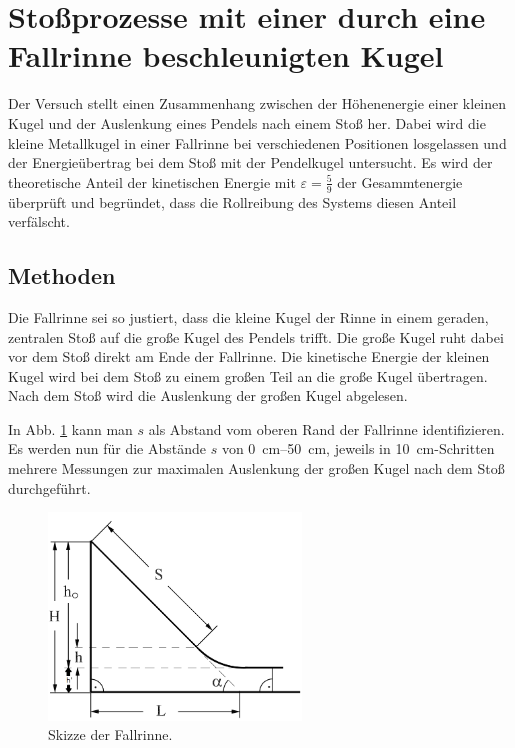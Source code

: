 \section{Stoßprozesse mit einer durch eine Fallrinne beschleunigten Kugel}
Der Versuch stellt einen Zusammenhang zwischen der Höhenenergie einer kleinen Kugel und der Auslenkung eines Pendels nach einem Stoß her.
Dabei wird die kleine Metallkugel in einer Fallrinne bei verschiedenen Positionen losgelassen und der Energieübertrag bei dem Stoß mit der Pendelkugel untersucht.
Es wird der theoretische Anteil der kinetischen Energie mit $\varepsilon = \frac{5}{9}$ der Gesammtenergie überprüft und begründet, dass die Rollreibung des Systems diesen Anteil verfälscht.

	\subsection{Methoden}
	Die Fallrinne sei so justiert, dass die kleine Kugel der Rinne in einem geraden, zentralen Stoß auf die große Kugel des Pendels trifft.
	Die große Kugel ruht dabei vor dem Stoß direkt am Ende der Fallrinne.
	Die kinetische Energie der kleinen Kugel wird bei dem Stoß zu einem großen Teil an die große Kugel übertragen.
	Nach dem Stoß wird die Auslenkung der großen Kugel abgelesen.
	
	In Abb. \ref{fig:fallrinneSkizze} kann man $s$ als Abstand vom oberen Rand der Fallrinne identifizieren.
	Es werden nun für die Abstände $s$ von \SIrange{0}{50}{\centi\meter}, jeweils in \SI{10}{\centi\meter}-Schritten mehrere Messungen zur maximalen Auslenkung der großen Kugel nach dem Stoß durchgeführt.
	
	\begin{figure}[ht]
		\centering
		\includegraphics[width=0.6\textwidth]{FallrinneSkizze.png}
		\caption{Skizze der Fallrinne.}
		\label{fig:fallrinneSkizze}	
	\end{figure}

